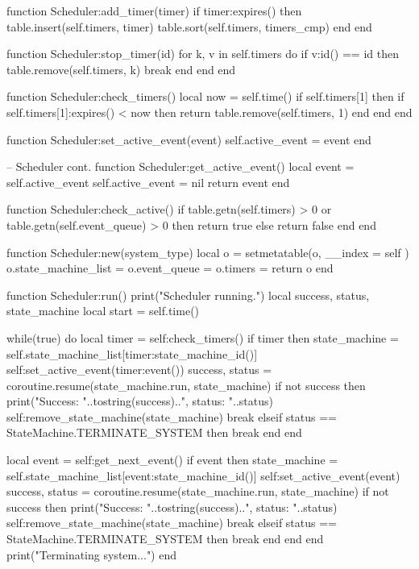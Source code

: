 \begin{appendices}
\begin{listing}[htp]
\begin{luacode}
function Scheduler:add_timer(timer)
  if timer:expires() then
    table.insert(self.timers, timer)
    table.sort(self.timers, timers_cmp)
  end
end

function Scheduler:stop_timer(id)
  for k, v in self.timers do
    if v:id() == id then
      table.remove(self.timers, k)
      break
    end
  end
end

function Scheduler:check_timers()
  local now = self.time()
  if self.timers[1] then
    if self.timers[1]:expires() < now then return table.remove(self.timers, 1) end
  end
end

function Scheduler:set_active_event(event)
  self.active_event = event
end

\end{luacode}
\end{listing}

\begin{listing}[htp]
\begin{luacode}
-- Scheduler cont.
function Scheduler:get_active_event()
  local event = self.active_event
  self.active_event = nil
  return event
end

function Scheduler:check_active()
  if table.getn(self.timers) > 0 or table.getn(self.event_queue) > 0 then
    return true
  else
    return false
  end
end

function Scheduler:new(system_type)
  local o = {}
  setmetatable(o, { __index = self })
  o.state_machine_list = {}
  o.event_queue = {}
  o.timers = {}
  return o
end

function Scheduler:run()
  print("Scheduler running.")
  local success, status, state_machine
  local start = self.time()

  while(true) do		
    local timer = self:check_timers()
    if timer then
      state_machine = self.state_machine_list[timer:state_machine_id()]
      self:set_active_event(timer:event())
      success, status = coroutine.resume(state_machine.run, state_machine)
      if not success then
        print("Success: "..tostring(success)..", status: "..status)
        self:remove_state_machine(state_machine)
        break
      elseif status == StateMachine.TERMINATE_SYSTEM then
        break
      end
    end

    local event = self:get_next_event()
    if event then
      state_machine = self.state_machine_list[event:state_machine_id()]
      self:set_active_event(event)
      success, status = coroutine.resume(state_machine.run, state_machine)
      if not success then
        print("Success: "..tostring(success)..", status: "..status)
        self:remove_state_machine(state_machine)
        break
      elseif status == StateMachine.TERMINATE_SYSTEM then
        break
      end
    end
  end
  print("Terminating system...")
end


\end{luacode}
\end{listing}
\end{appendices}
